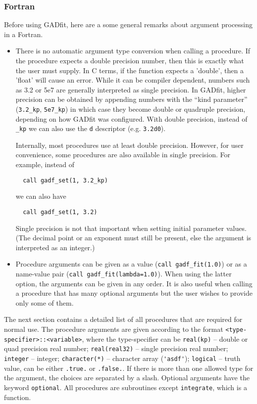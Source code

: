 \documentclass{article}
\begin{document}
\subsubsection{\label{sec:input_fortran}Fortran}

Before using GADfit, here are a some general remarks about argument processing in a Fortran.
\begin{itemize}
\item There is no automatic argument type conversion when calling a procedure. If the procedure expects a double precision number, then this is exactly what the user must supply. In C terms, if the function expects a 'double', then a 'float' will cause an error. While it can be compiler dependent, numbers such as 3.2 or 5e7 are generally interpreted as single precision. In GADfit, higher precision can be obtained by appending numbers with the ``kind parameter'' (\verb+3.2_kp+, \verb+5e7_kp+) in which case they become double or quadruple precision, depending on how GADfit was configured. With double precision, instead of \verb+_kp+ we can also use the \texttt{d} descriptor (e.g. \texttt{3.2d0}).

Internally, most procedures use at least double precision. However, for user convenience, some procedures are also available in single precision. For example, instead of
\begin{verbatim}
  call gadf_set(1, 3.2_kp)
\end{verbatim}
  we can also have
\begin{verbatim}
  call gadf_set(1, 3.2)
\end{verbatim}
  Single precision is not that important when setting initial parameter values. (The decimal point or an exponent must still be present, else the argument is interpreted as an integer.)

\item Procedure arguments can be given as a value (\verb+call gadf_fit(1.0)+) or as a name-value pair (\verb+call gadf_fit(lambda=1.0)+). When using the latter option, the arguments can be given in any order. It is also useful when calling a procedure that has many optional arguments but the user wishes to provide only some of them.
\end{itemize}
The next section contains a detailed list of all procedures that are required for normal use. The procedure arguments are given according to the format \verb+<type-specifier>::<variable>+, where the type-specifier can be \verb+real(kp)+ -- double or quad precision real number; \verb+real(real32)+ -- single precision real number; \verb+integer+ -- integer; \verb+character(*)+ -- character array (\verb+'asdf'+); \verb+logical+ -- truth value, can be either \verb+.true.+ or \verb+.false.+. If there is more than one allowed type for the argument, the choices are separated by a slash. Optional arguments have the keyword \verb+optional+. All procedures are subroutines except \verb+integrate+, which is a function.
\end{document}
